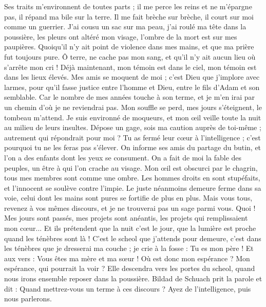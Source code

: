 \begin{multicols}{2}
Ses traits m'environnent de toutes parts ; il me perce les reins et ne m'épargne pas, il répand ma bile sur la terre.
Il me fait brèche sur brèche, il court sur moi comme un guerrier.
J'ai cousu un sac sur ma peau, j'ai roulé ma tête dans la poussière,
les pleurs ont altéré mon visage, l'ombre de la mort est sur mes paupières.
Quoiqu'il n'y ait point de violence dans mes mains, et que ma prière fut toujours pure.
Ô terre, ne cache pas mon sang, et qu'il n'y ait aucun lieu où s'arrête mon cri !
Déjà maintenant, mon témoin est dans le ciel, mon témoin est dans les lieux élevés.
Mes amis se moquent de moi ; c'est Dieu que j'implore avec larmes,
pour qu'il fasse justice entre l'homme et Dieu, entre le fils d'Adam et son semblable.
Car le nombre de mes années touche à son terme, et je m'en irai par un chemin d'où je ne reviendrai pas.
\VerseOne{}Mon souffle se perd, mes jours s'éteignent, le tombeau m'attend.
Je suis environné de moqueurs, et mon œil veille toute la nuit au milieu de leurs insultes.
Dépose un gage, sois ma caution auprès de toi-même ; autrement qui répondrait pour moi ?
Tu as fermé leur cœur à l'intelligence ; c'est pourquoi tu ne les feras pas s'élever.
On informe ses amis du partage du butin, et l'on a des enfants dont les yeux se consument.
On a fait de moi la fable des peuples, un être à qui l'on crache au visage.
Mon œil est obscurci par le chagrin, tous mes membres sont comme une ombre.
Les hommes droits en sont stupéfaits, et l'innocent se soulève contre l'impie.
Le juste néanmoins demeure ferme dans sa voie, celui dont les mains sont pures se fortifie de plus en plus.
Mais vous tous, revenez à vos mêmes discours, et je ne trouverai pas un sage parmi vous.
Quoi ! Mes jours sont passés, mes projets sont anéantis, les projets qui remplissaient mon cœur...
Et ils prétendent que la nuit c'est le jour, que la lumière est proche quand les ténèbres sont là !
C'est le scheol que j'attends pour demeure, c'est dans les ténèbres que je dresserai ma couche ;
je crie à la fosse : Tu es mon père ! Et aux vers : Vous êtes ma mère et ma sœur !
Où est donc mon espérance ? Mon espérance, qui pourrait la voir ?
Elle descendra vers les portes du scheol, quand nous irons ensemble reposer dans la poussière.
\VerseOne{}Bildad de Schuach prit la parole et dit :
Quand mettrez-vous un terme à ces discours ? Ayez de l'intelligence, puis nous parlerons.

\end{multicols}
